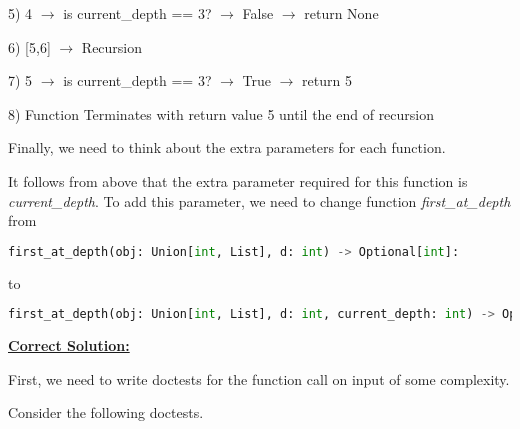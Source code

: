 \documentclass[12pt]{article}
\begin{document}
\begin{enumerate}[a.]
\begin{mdframed}
\begin{mdframed}
\begin{mdframed}
            \hspace{10mm} 5) 4 $\to$ is current\_depth == 3? $\to$ False $\to$ return None

            \hspace{10mm} 6) [5,6] $\to$ Recursion

            \bigskip

            \hspace{10mm} \hspace{10mm} 7) 5 $\to$ is current\_depth == 3? $\to$ True $\to$ return 5

            \bigskip

            8) Function Terminates with return value 5 until the end of recursion

        \end{mdframed}

        \bigskip

        Finally, we need to think about the extra parameters for each function.

        \bigskip

        It follows from above that the extra parameter required for this function is
        \textit{current\_depth}. To add this parameter, we need to change function
        \textit{first\_at\_depth} from

        \begin{lstlisting}[language=python,keepspaces=false]
        first_at_depth(obj: Union[int, List], d: int) -> Optional[int]:
        \end{lstlisting}

        to

        \begin{lstlisting}[language=python,keepspaces=false]
        first_at_depth(obj: Union[int, List], d: int, current_depth: int) -> Optional[int]:
        \end{lstlisting}

        \end{mdframed}
    \end{mdframed}

    \bigskip

    \begin{mdframed}
    \underline{\textbf{Correct Solution:}}

    \bigskip

    First, we need to write doctests for the function call on input of some complexity.

    \bigskip

    Consider the following doctests.


\end{mdframed}
\end{enumerate}
\end{document}
